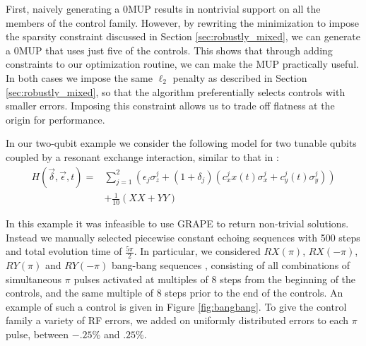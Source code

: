 \documentclass[aps,nofootinbib,pra,notitlepage,twocolumn]{revtex4-1}
\begin{document}


First, naively generating a 0MUP results in nontrivial support on all the members of the control family. However, by rewriting the minimization to impose the sparsity constraint discussed in Section \ref{sec:robustly_mixed}, we can generate a 0MUP that uses just five of the controls. This shows that through adding constraints to our optimization routine, we can make the MUP practically useful. In both cases we impose the same $\ell_2$ penalty as described in Section \ref{sec:robustly_mixed}, so that the algorithm preferentially selects controls with smaller errors. Imposing this constraint allows us to trade off flatness at the origin for performance.

In our two-qubit example we consider the following model for two tunable qubits coupled by a resonant exchange interaction, similar to that in \cite{McKay2016}:
\begin{equation} \label{eq:2Qham}
\begin{split}
H(\vec{\delta}, \vec{\epsilon}, t) = &\sum_{j=1}^2(\epsilon_j\sigma_z^j + (1 + \delta_j)(c_x^jx(t)\sigma_x^j + c_y^j(t)\sigma_y^j)) \\
&+ \frac{1}{10}(XX + YY)
\end{split}
\end{equation}

In this example it was infeasible to use GRAPE to return non-trivial solutions. Instead we manually selected piecewise constant echoing sequences with 500 steps and total evolution time of $\frac{5\pi}{2}$. In particular, we considered $RX(\pi)$, $RX(-\pi)$, $RY(\pi)$ and $RY(-\pi)$ bang-bang sequences \cite{bangbang}, consisting of all combinations of simultaneous $\pi$ pulses activated at multiples of $8$ steps from the beginning of the controls, and the same multiple of $8$ steps prior to the end of the controls. An example of such a control is given in Figure \ref{fig:bangbang}. To give the control family a variety of RF errors, we added on uniformly distributed errors to each $\pi$ pulse, between $-.25$\% and $.25$\%.
\end{document}
